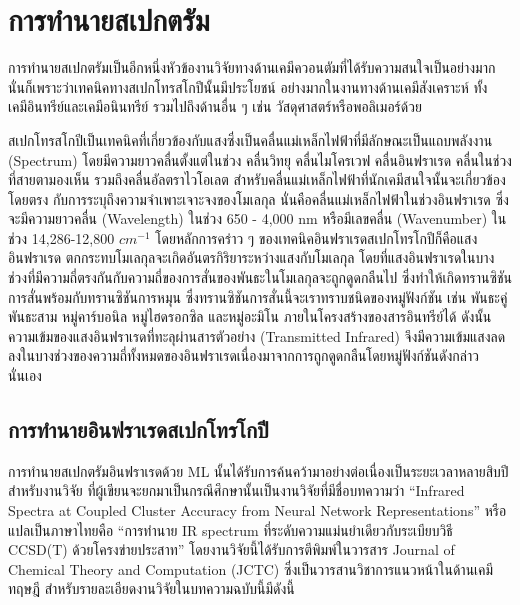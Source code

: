 \section{การทำนายสเปกตรัม}
\label{sec:pred_spectra}

การทำนายสเปกตรัมเป็นอีกหนึ่งหัวข้องานวิจัยทางด้านเคมีควอนตัมที่ได้รับความสนใจเป็นอย่างมากนั่นก็เพราะว่าเทคนิคทางสเปกโทรสโกปีนั้นมีประโยชน์%
อย่างมากในงานทางด้านเคมีสังเคราะห์ ทั้งเคมีอินทรีย์และเคมีอนินทรีย์ รวมไปถึงด้านอื่น ๆ เช่น วัสดุศาสตร์หรือพอลิเมอร์ด้วย 

สเปกโทรสโกปีเป็นเทคนิคที่เกี่ยวข้องกับแสงซึ่งเป็นคลื่นแม่เหล็กไฟฟ้าที่มีลักษณะเป็นแถบพลังงาน (Spectrum) โดยมีความยาวคลื่นตั้งแต่ในช่วง คลื่นวิทยุ 
คลื่นไมโครเวฟ คลื่นอินฟราเรด คลื่นในช่วงที่สายตามองเห็น รวมถึงคลื่นอัลตราไวโอเลต สำหรับคลื่นแม่เหล็กไฟฟ้าที่นักเคมีสนใจนั้นจะเกี่ยวข้องโดยตรง%
กับการระบุถึงความจำเพาะเจาะจงของโมเลกุล นั่นคือคลื่นแม่เหล็กไฟฟ้าในช่วงอินฟราเรด ซึ่งจะมีความยาวคลื่น (Wavelength) ในช่วง 650 - 4,000 
nm หรือมีเลขคลื่น (Wavenumber) ในช่วง 14,286-12,800 $cm^{-1}$ โดยหลักการคร่าว ๆ ของเทคนิคอินฟราเรดสเปกโทรโกปีก็คือแสงอินฟราเรด%
ตกกระทบโมเลกุลจะเกิดอันตรกิริยาระหว่างแสงกับโมเลกุล โดยที่แสงอินฟราเรดในบางช่วงที่มีความถี่ตรงกันกับความถี่ของการสั่นของพันธะในโมเลกุลจะถูกดูดกลืนไป 
ซึ่งทำให้เกิดทรานซิชันการสั่นพร้อมกับทรานซิชันการหมุน ซึ่งทรานซิชันการสั่นนี้จะเราทราบชนิดของหมู่ฟังก์ชัน เช่น พันธะคู่ พันธะสาม หมู่คาร์บอนิล 
หมู่ไฮดรอกซิล และหมู่อะมิโน ภายในโครงสร้างของสารอินทรีย์ได้ ดังนั้นความเข้มของแสงอินฟราเรดที่ทะลุผ่านสารตัวอย่าง (Transmitted Infrared) 
จึงมีความเข้มแสงลดลงในบางช่วงของความถี่ทั้งหมดของอินฟราเรดเนื่องมาจากการถูกดูดกลืนโดยหมู่ฟังก์ชันดังกล่าวนั่นเอง

\subsection{การทำนายอินฟราเรดสเปกโทรโกปี}
\label{ssec:pred_spec_ir}

การทำนายสเปกตรัมอินฟราเรดด้วย ML นั้นได้รับการค้นคว้ามาอย่างต่อเนื่องเป็นระยะเวลาหลายสิบปี\autocite{gastegger2017} สำหรับงานวิจัย%
ที่ผู้เขียนจะยกมาเป็นกรณีศึกษานั้นเป็นงานวิจัยที่มีชื่อบทความว่า \enquote{Infrared Spectra at Coupled Cluster Accuracy from Neural 
Network Representations} หรือแปลเป็นภาษาไทยคือ \enquote{การทำนาย IR spectrum ที่ระดับความแม่นยำเดียวกับระเบียบวิธี CCSD(T) 
ด้วยโครงข่ายประสาท}\autocite{beckmann2022} โดยงานวิจัยนี้ได้รับการตีพิมพ์ในวารสาร Journal of Chemical Theory and Computation 
(JCTC) ซึ่งเป็นวารสานวิชาการแนวหน้าในด้านเคมีทฤษฎี สำหรับรายละเอียดงานวิจัยในบทความฉบับนี้มีดังนี้

